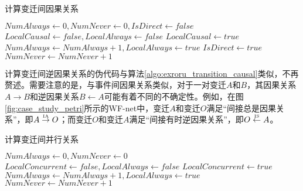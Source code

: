 \begin{algorithm}[htbp]
  \LinesNumbered
  \caption{计算变迁间因果关系}
  \label{algo:exroru_transition_causal}
  $NumAlways\leftarrow 0,NumNever\leftarrow 0,IsDirect\leftarrow false$\;
   {
	$LocalCausal\leftarrow false,LocalAlways\leftarrow false$\;
	 {
  	   {
  	    $LocalCausal\leftarrow true$\;
  	  }
	   {
		$NumAlways\leftarrow NumAlways+1,LocalAlways\leftarrow true$\;
	  }
	   {
	    $IsDirect\leftarrow true$\;
	  }
	}
	 {
	  $NumNever\leftarrow NumNever+1$\;
	}
  }
   {
  }  {
  }  {
  }  {
  } 
\end{algorithm}

计算变迁间逆因果关系的伪代码与算法\ref{algo:exroru_transition_causal}类似，不再赘述。需要注意的是，与事件间因果关系类似，对于一对变迁$A$和$B$，其因果关系$A\rightarrow B$和逆因果关系$B\leftarrow A$可能有着不同的不确定性。例如，在图\ref{fig:case_study_petri}所示的WF-net中，变迁$A$和变迁$O$满足“间接总是因果关系”，即$A\overset{\text{\tiny{IA}}}{\rightarrow}O$；而变迁$O$和变迁$A$满足“间接有时逆因果关系”，即$O\overset{\text{\tiny{IS}}}{\leftarrow}A$。

\begin{algorithm}[htbp]
  \LinesNumbered
  \caption{计算变迁间并行关系}
  \label{algo:exroru_transition_concurrent}
  $NumAlways\leftarrow 0,NumNever\leftarrow 0$\;
   {
    $LocalConcurrent\leftarrow false,LocalAlways\leftarrow false$\;
     {
       {
        $LocalConcurrent\leftarrow true$\;
      }
       {
        $NumAlways\leftarrow NumAlways+1,LocalAlways\leftarrow true$\;
      }
    }
     {
      $NumNever\leftarrow NumNever+1$\;
    }
  }
   {
  }  {
  } 
\end{algorithm}

